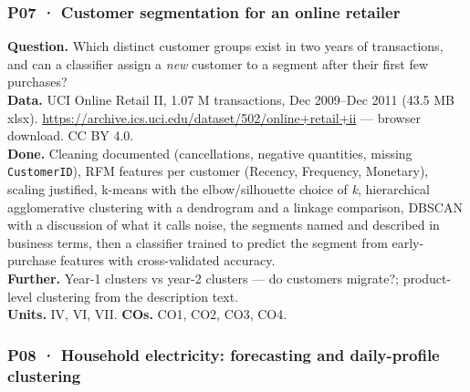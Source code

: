\documentclass[11pt]{article}
\begin{document}
\hypertarget{p07-customer-segmentation-for-an-online-retailer}{%
\subsubsection{P07 · Customer segmentation for an online retailer}\label{p07-customer-segmentation-for-an-online-retailer}}

\textbf{Question.} Which distinct customer groups exist in two years of transactions, and can a classifier assign a \emph{new} customer to a segment after their first few purchases?\\
\textbf{Data.} UCI Online Retail II, 1.07 M transactions, Dec 2009--Dec 2011 (43.5 MB xlsx). \url{https://archive.ics.uci.edu/dataset/502/online+retail+ii} --- browser download. CC BY 4.0.\\
\textbf{Done.} Cleaning documented (cancellations, negative quantities, missing \texttt{CustomerID}), RFM features per customer (Recency, Frequency, Monetary), scaling justified, k-means with the elbow/silhouette choice of \emph{k}, hierarchical agglomerative clustering with a dendrogram and a linkage comparison, DBSCAN with a discussion of what it calls noise, the segments named and described in business terms, then a classifier trained to predict the segment from early-purchase features with cross-validated accuracy.\\
\textbf{Further.} Year-1 clusters vs year-2 clusters --- do customers migrate?; product-level clustering from the description text.\\
\textbf{Units.} IV, VI, VII. \textbf{COs.} CO1, CO2, CO3, CO4.

\hypertarget{p08-household-electricity-forecasting-and-daily-profile-clustering}{%
\subsubsection{P08 · Household electricity: forecasting and daily-profile clustering}\label{p08-household-electricity-forecasting-and-daily-profile-clustering}}
\end{document}
